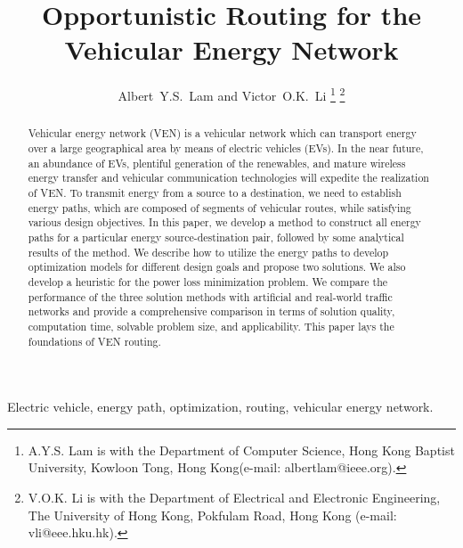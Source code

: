 \documentclass[journal]{IEEEtran}
\begin{document}
\title{Opportunistic Routing for the Vehicular Energy Network}




\author{Albert~Y.S.~Lam and
        Victor~O.K.~Li
\thanks{A.Y.S. Lam is with the Department
of Computer Science, Hong Kong Baptist University, Kowloon Tong, Hong Kong(e-mail: albertlam@ieee.org).}
\thanks{V.O.K. Li is with the Department
of Electrical and Electronic Engineering, The University of Hong Kong, Pokfulam Road, Hong Kong (e-mail: vli@eee.hku.hk).}}









\maketitle


\begin{abstract}
Vehicular energy network (VEN) is a vehicular network which can transport energy over a large geographical area by means of electric vehicles (EVs). In the near future, an abundance of EVs, plentiful generation of the renewables, and  mature wireless energy transfer and vehicular communication technologies will expedite the realization of VEN. 
To transmit energy from a source to a destination, we need to establish energy paths, which are composed of segments of vehicular routes, while satisfying various design objectives. In this paper, we develop a method to construct all energy paths for a particular energy source-destination pair, followed by some analytical results of the method. We describe how to utilize the energy paths to develop optimization models for different design goals and propose two  solutions. We also develop a heuristic for the power loss minimization problem. We compare the performance of the three solution methods with artificial and real-world traffic networks and provide a comprehensive comparison in terms of solution quality, computation time, solvable problem size, and applicability. This paper lays the foundations of VEN routing.

\end{abstract}
\begin{IEEEkeywords}
Electric vehicle, energy path, optimization, routing, vehicular energy network.
\end{IEEEkeywords}




\IEEEpeerreviewmaketitle
\end{document}

